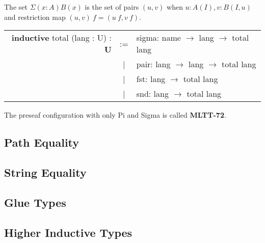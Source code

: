 \documentclass[a4paper,UKenglish,cleveref, autoref, thm-restate]{lipics-v2021}
\begin{document}
\begin{definition}[Sigma]
The set $\Sigma(x:A)B(x)$ is the set of pairs $(u,v)$ when $u:A(I),v:B(I,u)$ and restriction map $(u,v)\ f=(u\ f,v\ f)$.
\end{definition}

\begin{table}[ht]
\begin{tabular}{rcl}
  \textbf{inductive} total (lang : U) : \textbf{U}& := & sigma: name $\rightarrow$ lang $\rightarrow$ total lang \\
  &|& pair: lang $\rightarrow$ lang $\rightarrow$ total lang \\
  &|& fst: lang $\rightarrow$ total lang \\
  &|& snd: lang $\rightarrow$ total lang \\
\end{tabular}
\end{table}

The preseaf configuration with only Pi and Sigma is called \textbf{MLTT-72}.

\subsection{Path Equality}

\subsection{String Equality}

\subsection{Glue Types}

\subsection{Higher Inductive Types}
\end{document}
